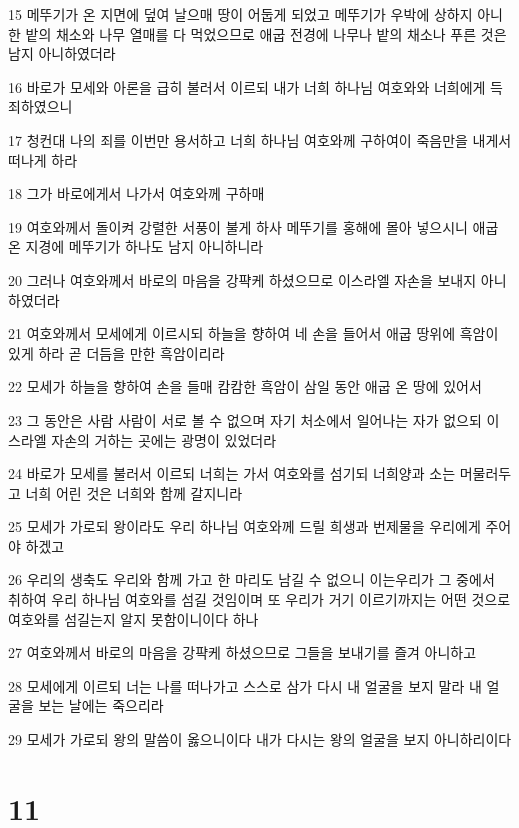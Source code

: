 \par 15 메뚜기가 온 지면에 덮여 날으매 땅이 어둡게 되었고 메뚜기가 우박에 상하지 아니한 밭의 채소와 나무 열매를 다 먹었으므로 애굽 전경에 나무나 밭의 채소나 푸른 것은 남지 아니하였더라
\par 16 바로가 모세와 아론을 급히 불러서 이르되 내가 너희 하나님 여호와와 너희에게 득죄하였으니
\par 17 청컨대 나의 죄를 이번만 용서하고 너희 하나님 여호와께 구하여이 죽음만을 내게서 떠나게 하라
\par 18 그가 바로에게서 나가서 여호와께 구하매
\par 19 여호와께서 돌이켜 강렬한 서풍이 불게 하사 메뚜기를 홍해에 몰아 넣으시니 애굽 온 지경에 메뚜기가 하나도 남지 아니하니라
\par 20 그러나 여호와께서 바로의 마음을 강퍅케 하셨으므로 이스라엘 자손을 보내지 아니하였더라
\par 21 여호와께서 모세에게 이르시되 하늘을 향하여 네 손을 들어서 애굽 땅위에 흑암이 있게 하라 곧 더듬을 만한 흑암이리라
\par 22 모세가 하늘을 향하여 손을 들매 캄캄한 흑암이 삼일 동안 애굽 온 땅에 있어서
\par 23 그 동안은 사람 사람이 서로 볼 수 없으며 자기 처소에서 일어나는 자가 없으되 이스라엘 자손의 거하는 곳에는 광명이 있었더라
\par 24 바로가 모세를 불러서 이르되 너희는 가서 여호와를 섬기되 너희양과 소는 머물러두고 너희 어린 것은 너희와 함께 갈지니라
\par 25 모세가 가로되 왕이라도 우리 하나님 여호와께 드릴 희생과 번제물을 우리에게 주어야 하겠고
\par 26 우리의 생축도 우리와 함께 가고 한 마리도 남길 수 없으니 이는우리가 그 중에서 취하여 우리 하나님 여호와를 섬길 것임이며 또 우리가 거기 이르기까지는 어떤 것으로 여호와를 섬길는지 알지 못함이니이다 하나
\par 27 여호와께서 바로의 마음을 강퍅케 하셨으므로 그들을 보내기를 즐겨 아니하고
\par 28 모세에게 이르되 너는 나를 떠나가고 스스로 삼가 다시 내 얼굴을 보지 말라 내 얼굴을 보는 날에는 죽으리라
\par 29 모세가 가로되 왕의 말씀이 옳으니이다 내가 다시는 왕의 얼굴을 보지 아니하리이다

\chapter{11}

